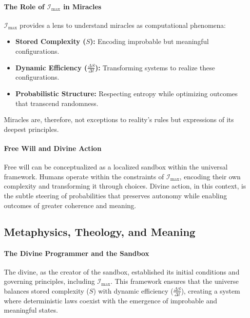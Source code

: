 \documentclass[12pt]{article}
\begin{document}
\paragraph{The Role of \(\mathcal{I}_{\text{max}}\) in Miracles}
\(\mathcal{I}_{\text{max}}\) provides a lens to understand miracles as computational phenomena:
\begin{itemize}
    \item \textbf{Stored Complexity (\(S\)):} Encoding improbable but meaningful configurations.
    \item \textbf{Dynamic Efficiency (\(\frac{\Delta S}{\Delta t}\)):} Transforming systems to realize these configurations.
    \item \textbf{Probabilistic Structure:} Respecting entropy while optimizing outcomes that transcend randomness.
\end{itemize}
Miracles are, therefore, not exceptions to reality’s rules but expressions of its deepest principles.

\paragraph{Free Will and Divine Action}
Free will can be conceptualized as a localized sandbox within the universal framework. Humans operate within the constraints of \(\mathcal{I}_{\text{max}}\), encoding their own complexity and transforming it through choices. Divine action, in this context, is the subtle steering of probabilities that preserves autonomy while enabling outcomes of greater coherence and meaning.

\subsection{Metaphysics, Theology, and Meaning}

\paragraph{The Divine Programmer and the Sandbox}
The divine, as the creator of the sandbox, established its initial conditions and governing principles, including \(\mathcal{I}_{\text{max}}\). This framework ensures that the universe balances stored complexity (\(S\)) with dynamic efficiency (\(\frac{\Delta S}{\Delta t}\)), creating a system where deterministic laws coexist with the emergence of improbable and meaningful states.
\end{document}
